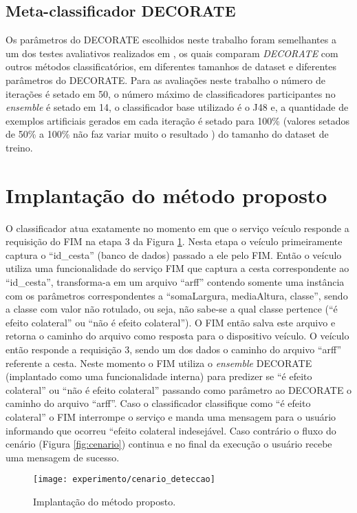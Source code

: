 \subsection{Meta-classificador DECORATE}
Os parâmetros do DECORATE escolhidos neste trabalho foram semelhantes a um dos testes avaliativos realizados em \cite{Melville:2004}, os quais comparam \textit{DECORATE} com outros métodos classificatórios, em diferentes tamanhos de dataset e diferentes parâmetros do DECORATE. Para as avaliações neste trabalho o número de iterações é setado em 50, o número máximo de classificadores participantes no \textit{ensemble} é setado em 14, o classificador base utilizado é o J48 e, a quantidade de exemplos artificiais gerados em cada iteração é setado para 100\% (valores setados de 50\% a 100\% não faz variar muito o resultado \cite{Melville:2004}) do tamanho do dataset de treino.

\section{Implantação do método proposto}
\label{sec:implmetprop}
O classificador atua exatamente no momento em que o serviço veículo responde a requisição do FIM na etapa 3 da Figura \ref{fig:cenario_deteccao}. Nesta etapa o veículo primeiramente captura o ``id\_cesta'' (banco de dados) passado a ele pelo FIM. Então o veículo utiliza uma funcionalidade do serviço FIM que captura a cesta correspondente ao ``id\_cesta'', transforma-a em um arquivo ``arff'' contendo somente uma instância com os parâmetros correspondentes a ``somaLargura, mediaAltura, classe'', sendo a classe com valor não rotulado, ou seja, não sabe-se a qual classe pertence (``é efeito colateral'' ou ``não é efeito colateral''). O FIM então salva este arquivo e retorna o caminho do arquivo como resposta para o dispositivo veículo. O veículo então responde a requisição 3, sendo um dos dados o caminho do arquivo ``arff'' referente a cesta. Neste momento o FIM utiliza o \textit{ensemble} DECORATE (implantado como uma funcionalidade interna) para predizer se ``é efeito colateral'' ou ``não é efeito colateral'' passando como parâmetro ao DECORATE o caminho do arquivo ``arff''. Caso o classificador classifique como ``é efeito colateral'' o FIM interrompe o serviço e manda uma mensagem para o usuário informando que ocorreu ``efeito colateral indesejável. Caso contrário o fluxo do cenário (Figura \ref{fig:cenario}) continua e no final da execução o usuário recebe uma mensagem de sucesso.

\begin{figure}[!htb] \centering 
  \centering
  \texttt{[image: experimento/cenario\_deteccao]} 
  \caption{Implantação do método proposto.} 
  \label{fig:cenario_deteccao}
\end{figure}
